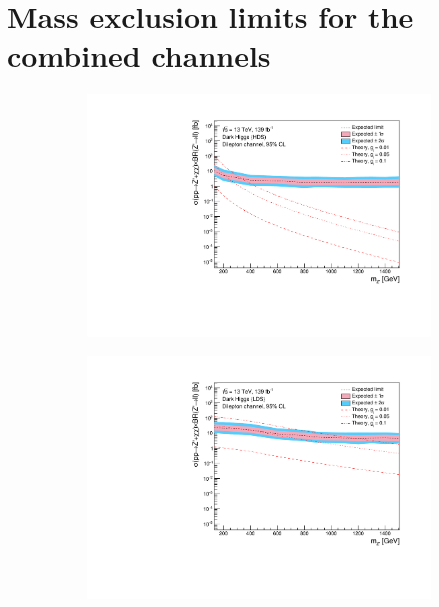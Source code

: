 \documentclass[12pt, a4paper]{book}
\begin{document}
\section{Mass exclusion limits for the combined channels}
\begin{figure}[!ht]
	\centering
	\begin{subfigure}[b]{0.49\textwidth}
      \centering
      \includegraphics[width=1\textwidth]{Limits/DH_HDS/mass_exclusion_comb.pdf}
   \end{subfigure}
   \hfill
   \begin{subfigure}[b]{0.49\textwidth}
      \centering
      \includegraphics[width=1\textwidth]{Limits/DH_LDS/mass_exclusion_comb.pdf}
   \end{subfigure}
   \hfill
   \begin{subfigure}[b]{0.49\textwidth}

\end{subfigure}
\end{figure}
\end{document}
